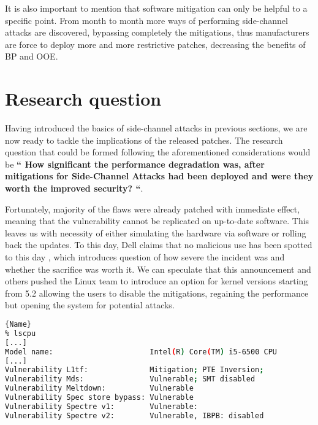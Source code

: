\documentclass{csfourzero}
\begin{document}
It is also important to mention that software mitigation can only be helpful to a specific point. From month to month more ways of performing side-channel attacks are discovered, bypassing completely the mitigations, thus manufacturers are force to deploy more and more restrictive patches, decreasing the benefits of BP and OOE.


\section{Research question}
\label{sec:rq}
Having introduced the basics of side-channel attacks in previous sections, we are now ready to tackle the implications of the released patches. The research question that could be formed following the aforementioned considerations would be \textbf{`` How significant the performance degradation was, after mitigations for Side-Channel Attacks had been deployed and were they worth the improved security? ``}. 

Fortunately, majority of the flaws were already patched with immediate effect, meaning that the vulnerability cannot be replicated on up-to-date software. This leaves us with necessity of either simulating the hardware via software or rolling back the updates. To this day, Dell claims that no malicious use has been spotted to this day \cite{dell}, which introduces question of how severe the incident was and whether the sacrifice was worth it. We can speculate that this announcement and others pushed the Linux team to introduce an option for kernel versions starting from 5.2 allowing the users to disable the mitigations, regaining the performance but opening the system for potential attacks.  

\begin{lstlisting}[caption=Vulnerable Linux system with disabled mitigations,frame=tlrb,language=bash]{Name}
% lscpu            
[...]
Model name:                      Intel(R) Core(TM) i5-6500 CPU 
[...]
Vulnerability L1tf:              Mitigation; PTE Inversion;
Vulnerability Mds:               Vulnerable; SMT disabled
Vulnerability Meltdown:          Vulnerable
Vulnerability Spec store bypass: Vulnerable
Vulnerability Spectre v1:        Vulnerable:
Vulnerability Spectre v2:        Vulnerable, IBPB: disabled
\end{lstlisting}
\end{document}
